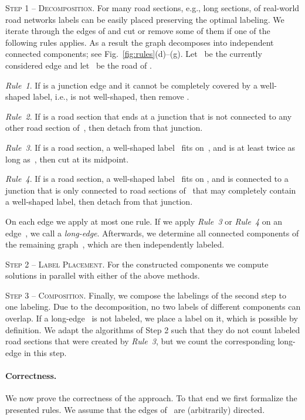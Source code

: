 \documentclass[a4paper,11pt]{article}
\newcommand{\RuleA}{\textit{Rule~1}\xspace}
\newcommand{\RuleB}{\textit{Rule~2}\xspace}
\newcommand{\RuleC}{\textit{Rule~3}\xspace}
\newcommand{\RuleD}{\textit{Rule~4}\xspace}
\begin{document}
\textsc{Step 1 -- Decomposition.} For many road sections, e.g., long
sections, of real-world road networks labels can be easily placed
preserving the optimal labeling.  We iterate through the edges of  and cut or remove some of them if one of the following rules applies. As a result the graph decomposes into independent connected
components; see Fig.~\ref{fig:rules}(d)--(g). Let~ be the
currently considered edge and let~ be the road of . 


\RuleA. If  is a junction edge and it cannot be completely covered
by a well-shaped label, i.e.,  is not well-shaped, then remove .


\RuleB. If  is a road section that ends at a junction that is not
connected to any other road section of~, then detach  from that junction.

\RuleC. If  is a road section, a well-shaped label~
fits on~, and  is at least twice as long as~, then cut  at its
midpoint. 


\RuleD. If  is a road section, a well-shaped label~ fits on , and
 is connected to a junction that is only connected to road sections
of~ that may completely contain a well-shaped label, then detach  from that junction.













On each edge we apply at most one rule. If we apply
\RuleC or \RuleD on an edge~, we call  a \emph{long-edge}. Afterwards, we determine all connected components
of the remaining graph~, which are then independently labeled. 

\textsc{Step 2 -- Label Placement.} For the constructed components we compute solutions in parallel with either of the above methods.




\textsc{Step 3 -- Composition.} Finally, we compose the labelings of
the second step to one labeling. Due to the decomposition, no two
labels of different components can overlap. If a long-edge~ is not
labeled, we place a label on it, which is possible by definition.  We
adapt the algorithms of Step 2 such that they do not count labeled
road sections that were created by \RuleC, but we count the
corresponding long-edge in this step.

\paragraph{Correctness.} We now prove the correctness of the
approach. To that end we first formalize the presented rules. We
assume that the edges of~ are (arbitrarily)
directed. 
\end{document}
